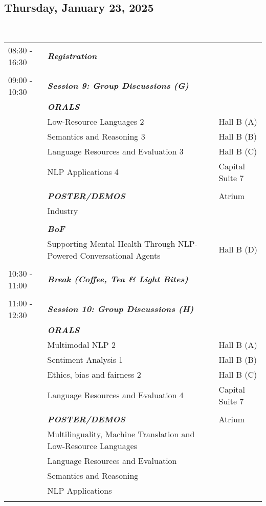 \subsection{Thursday, January 23, 2025}
\\
\begin{longtable}{p{15mm}p{60mm}p{30mm}}
{08:30 - 16:30} & \emph{\textbf{Registration}} & \\\\
{09:00 - 10:30} & \emph{\textbf{Session 9: Group Discussions (G)}} & \\
& \emph{\textbf{ORALS}} & \\
& Low-Resource Languages 2 & Hall B (A) \\
& Semantics and Reasoning 3 & Hall B (B) \\
& Language Resources and Evaluation 3 & Hall B (C) \\
& NLP Applications 4 & Capital Suite 7 \\\\
& \emph{\textbf{POSTER/DEMOS}} & Atrium \\
& Industry & \\\\
& \emph{\textbf{BoF}} & \\
& Supporting Mental Health Through NLP-Powered Conversational Agents & Hall B (D) \\\\
{10:30 - 11:00} & \emph{\textbf{Break (Coffee, Tea \& Light Bites)}} & \\\\
{11:00 - 12:30} & \emph{\textbf{Session 10: Group Discussions (H)}} & \\
& \emph{\textbf{ORALS}} & \\
& Multimodal NLP 2 & Hall B (A) \\
& Sentiment Analysis 1 & Hall B (B) \\
& Ethics, bias and fairness 2 & Hall B (C) \\
& Language Resources and Evaluation 4 & Capital Suite 7 \\\\
& \emph{\textbf{POSTER/DEMOS}} & Atrium \\
& Multilinguality, Machine Translation and Low-Resource Languages & \\
& Language Resources and Evaluation & \\
& Semantics and Reasoning & \\
& NLP Applications & \\\\

\end{longtable}
